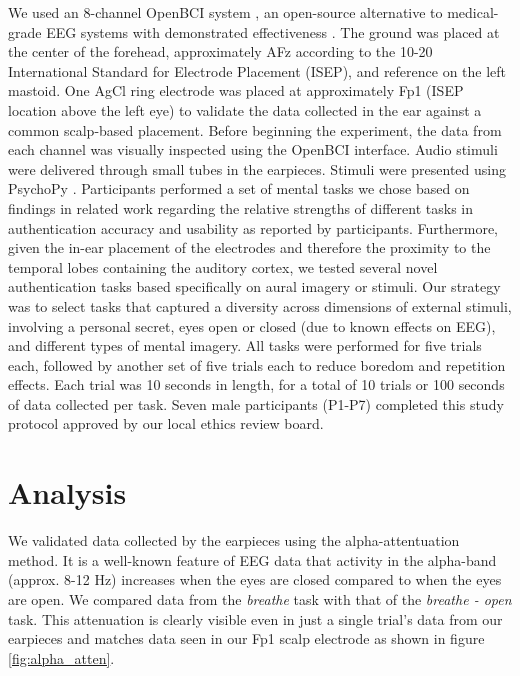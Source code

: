\documentclass{sigchi-ext}
\begin{document}
We used an 8-channel OpenBCI system \cite{michalska2009openbci}, an open-source alternative to medical-grade EEG systems with demonstrated effectiveness \cite{Frey2016}. The ground was placed at the center of the forehead, approximately AFz according to the 10-20 International Standard for Electrode Placement (ISEP), and reference on the left mastoid. One AgCl ring electrode was placed at approximately Fp1 (ISEP location above the left eye) to validate the data collected in the ear against a common scalp-based placement. Before beginning the experiment, the data from each channel was visually inspected using the OpenBCI interface. Audio stimuli were delivered through small tubes in the earpieces. Stimuli were presented using PsychoPy \cite{peirce2007psychopy}. Participants performed a set of mental tasks we chose based on findings in related work regarding the relative strengths of different tasks in authentication accuracy and usability as reported by participants. \cite{Chuang2013b, curran2016passthoughts} Furthermore, given the in-ear placement of the electrodes and therefore the proximity to the temporal lobes containing the auditory cortex, we tested several novel authentication tasks based specifically on aural imagery or stimuli. Our strategy was to select tasks that captured a diversity across dimensions of external stimuli, involving a personal secret, eyes open or closed (due to known effects on EEG), and different types of mental imagery. All tasks were performed for five trials each, followed by another set of five trials each to reduce boredom and repetition effects. Each trial was 10 seconds in length, for a total of 10 trials or 100 seconds of data collected per task. Seven male participants (P1-P7) completed this study protocol approved by our local ethics review board.

\section{Analysis}
We validated data collected by the earpieces using the alpha-attentuation method. It is a well-known feature of EEG data that activity in the alpha-band (approx. 8-12 Hz) increases when the eyes are closed compared to when the eyes are open. We compared data from the \textit{breathe} task with that of the \textit{breathe - open} task.  This attenuation is clearly visible even in just a single trial's data from our earpieces and matches data seen in our Fp1 scalp electrode as shown in figure \ref{fig:alpha_atten}.
\end{document}
